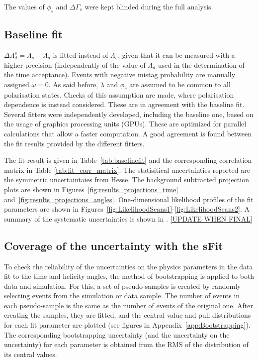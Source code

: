 The values of $\phi_s$ and $\Delta \Gamma_s$ were kept blinded during the full analysis.

\subsection{Baseline fit}
$\Delta\Lambda_d^s = \Lambda_s - \Lambda_d$ is fitted instead of $\Lambda_s$, given that it can be measured with a higher precision (independently of the value of $\Lambda_d$ used in the determination of the time acceptance). Events with negative mistag probability are manually assigned $\omega = 0$.
As said before, $\lambda$ and $\phi_s$ are assumed to be common to all polarisation states.  Checks of this assumption are made, where polarisation dependence is instead considered. These are in agreement with the baseline fit. 
Several fitters were independently developed, including the baseline one, based on the usage of graphics processing units (GPUs). These are optimized for parallel calculations that allow a faster computation. A good agreement is found between the fit results provided by the different fitters. 

The fit result is given in Table~\ref{tab:baselinefit} and the corresponding
correlation matrix in Table \ref{tab:fit_corr_matrix}.
The statisitical uncertainties reported are the symmetric uncertaintaies from Hesse. The background subtracted projection plots are shown in
Figures~\ref{fig:results_projections_time} and~\ref{fig:results_projections_angles}. 
One-dimensional likelihood profiles of the fit parameters are shown in Figures~\ref{fig:LikelihoodScans1}-\ref{fig:LikelihoodScans2}.  A summary of the systematic uncertainties is shown in . \ref{UPDATE WHEN FINAL}

\subsection{Coverage of the uncertainty with the sFit}

To check the reliability of the uncertainties on the physics parameters in the data fit to the time and helicity angles, the method of bootstrapping is applied to both data and simulation. For this, a set of pseudo-samples is created by randomly selecting events from the simulation or data sample. The number of events in each pseudo-sample is the same as the number of events of the original one. 
After creating the samples, they are fitted, and the central value and pull distributions for each fit parameter are plotted (see figures in Appendix~\ref{app:Bootstrapping}). The corresponding  bootstrapping uncertainty (and the uncertainty on the uncertainty) for each parameter is obtained from the RMS of the distribution of its central values.

